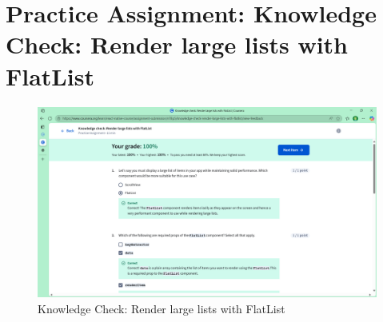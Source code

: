 \section{Practice Assignment: Knowledge Check: Render large lists with FlatList}
\begin{figure}[H]
    \centering
    \includegraphics[width=0.5\linewidth]{images/kc-1.png}
    \caption{Knowledge Check: Render large lists with FlatList}
\end{figure}